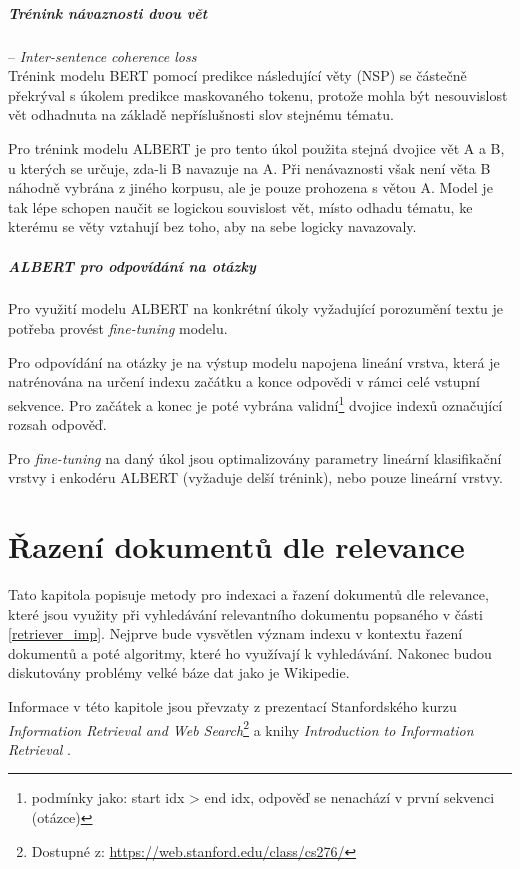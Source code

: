\paragraph{Trénink návaznosti dvou vět} -- \textit{Inter-sentence coherence loss}\\
Trénink modelu BERT pomocí predikce následující věty (NSP) se částečně překrýval s úkolem predikce maskovaného tokenu, protože mohla být nesouvislost vět odhadnuta na základě nepříslušnosti slov stejnému tématu.\par
Pro trénink modelu ALBERT je pro tento úkol použita stejná dvojice vět A a B, u kterých se určuje, zda-li B navazuje na A. Při nenávaznosti však není věta B náhodně vybrána z jiného korpusu, ale je pouze prohozena s větou A. Model je tak lépe schopen naučit se logickou souvislost vět, místo odhadu tématu, ke kterému se věty vztahují bez toho, aby na sebe logicky navazovaly.
\bigskip\bigskip
\paragraph{ALBERT pro odpovídání na otázky}
Pro využití modelu ALBERT na konkrétní úkoly vyžadující porozumění textu je potřeba provést \emph{fine-tuning} modelu.\par
Pro odpovídání na otázky je na výstup modelu napojena lineání vrstva, která je natrénována na určení indexu začátku a konce odpovědi v rámci celé vstupní sekvence. Pro začátek a konec je poté vybrána validní\footnote{podmínky jako: start idx > end idx, odpověď se nenachází v první sekvenci (otázce)} dvojice indexů označující rozsah odpověď.\par
Pro \emph{fine-tuning} na daný úkol jsou optimalizovány parametry lineární klasifikační vrstvy i enkodéru ALBERT (vyžaduje delší trénink), nebo pouze lineární vrstvy.


\chapter{Řazení dokumentů dle relevance}
\label{document_indexing}
Tato kapitola popisuje metody pro indexaci a řazení dokumentů dle relevance, které jsou využity při vyhledávání relevantního dokumentu popsaného v části \ref{retriever_imp}. Nejprve bude vysvětlen význam indexu v kontextu řazení dokumentů a poté algoritmy, které ho využívají k vyhledávání. Nakonec budou diskutovány problémy velké báze dat jako je Wikipedie.\par
Informace v této kapitole jsou převzaty z prezentací Stanfordského kurzu \emph{Information Retrieval and Web Search}\footnote{Dostupné z: \url{https://web.stanford.edu/class/cs276/}} a knihy \emph{Introduction to Information Retrieval} \cite{information_retrieval}.

